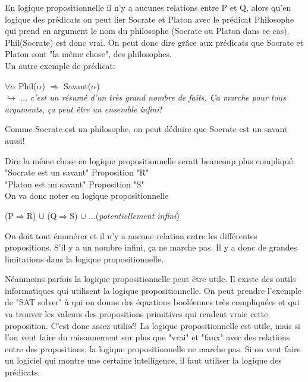 En logique propositionnelle il n'y a aucunes relations entre P et Q, alors qu'en logique des prédicats on peut lier Socrate et Platon avec le prédicat Philosophe qui prend en argument le nom du philosophe (Socrate ou Platon dans ce cas). Phil(Socrate) est donc vrai. On peut donc dire grâce aux prédicats que Socrate et Platon sont "la même chose", des philosophes.\\

Un autre exemple de prédicat:

\begin{center}
$\forall \alpha$ Phil($\alpha$) $\Rightarrow$ Savant($\alpha$)\\
\vspace{3mm}
$\hookrightarrow$ ... \textit{c'est un résumé d'un très grand nombre de faits. Ça marche pour tous arguments, ça peut être un ensemble infini!}
\end{center}
Comme Socrate est un philosophe, on peut déduire que Socrate est un savant aussi!

Dire la même chose en logique propositionnelle serait beaucoup plus compliqué: \\

"Socrate est un savant" Proposition "R"\\
\indent "Platon est un savant" Proposition "S"\\

On va donc noter en logique propositionnelle
\begin{center}
(P$\Rightarrow$R) $\cup$ (Q$\Rightarrow$S) $\cup$ ...(\textit{potentiellement infini})
\end{center}

On doit tout énumérer et il n'y a aucune relation entre les différentes propositions. S'il y a un nombre infini, ça ne marche pas. Il y a donc de grandes limitations dans la logique propositionnelle.

Néanmoins parfois la logique propositionnelle peut être utile. 
Il existe des outils informatiques qui utilisent la logique propositionnelle. On peut prendre l'exemple de "SAT solver" à qui on donne des équations booléennes très compliquées et qui va trouver les valeurs des propositions primitives qui rendent vraie cette proposition. C'est donc assez utilisé! La logique propositionnelle est utile, mais si l'on veut faire du raisonnement sur plus que  "vrai" et "faux" avec des relations entre des propositions,  la logique propositionnelle ne marche pas. Si on veut faire un logiciel qui montre une certaine intelligence, il faut utiliser la logique des prédicats.\\


